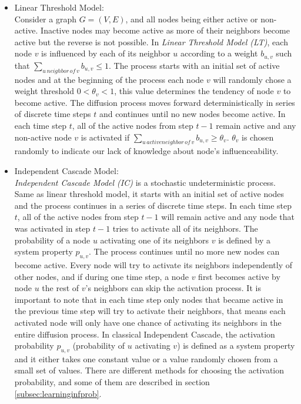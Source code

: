 \documentclass[english]{tktltiki}
\begin{document}
\begin{itemize}
\item Linear Threshold Model:\\
Consider a graph $G=(V,E)$, and all nodes being either active or non-active. Inactive nodes may become active as more of their neighbors become active but the reverse is not possible. In \textit{Linear Threshold Model (LT)}, each node $v$ is influenced by each of its neighbor $u$ according to a weight $b_{u,v}$ such that $\sum \nolimits_{u \, neighbor \, of \, v} b_{u,v} \leq 1$. The process starts with an initial set of active nodes and at the beginning of the process each node $v$ will randomly chose a weight threshold $0 < \theta_v<1 $, this value determines the tendency of node $v$ to become active. The diffusion process moves forward deterministically in series of discrete time steps $t$ and continues until no new nodes become active. In each time step $t$, all of the active nodes from step $t-1$ remain active and any non-active node $v$ is activated if $\sum \nolimits_{u \, active neighbor \, of \, v} b_{u,v} \geq \theta_v$. $\theta_v$ is chosen randomly to indicate our lack of knowledge about node's influenceability.  

\item Independent Cascade Model:\\ 
 \textit{Independent Cascade Model (IC)} is a stochastic undeterministic process. Same as linear threshold model, it starts with an initial set of active nodes and the process continues in a series of discrete time steps. In each time step $t$, all of the active nodes from step $t-1$ will remain active and any node that was activated in step $t-1$ tries to activate all of its neighbors. The probability of a node $u$ activating one of its neighbors $v$ is defined by a system property $p_{u,v}$. The process continues until no more new nodes can become active. Every node will try to activate its neighbors independently of other nodes, and if during one time step, a node $v$ first becomes active by node $u$ the rest of $v$'s neighbors can skip the activation process. It is important to note that in each time step only nodes that became active in the previous time step will try to activate their neighbors, that means each activated node will only have one chance of activating its neighbors in the entire diffusion process. In classical Independent Cascade, the activation probability $p_{u,v}$ (probability of $u$ activating $v$) is defined as a system property and it either takes one constant value or a value randomly chosen from a small set of values. There are different methods for choosing the activation probability, and some of them are described in section \ref{subsec:learninginfprob}. 
\end{itemize}
\end{document}
